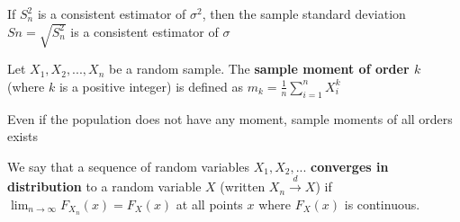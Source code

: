 \begin{thm}
    If $S_n^2$ is a consistent estimator of $\sigma^2$, then the sample standard deviation $Sn = \sqrt{S_n^2}$ is a consistent estimator of $\sigma$
\end{thm}

\begin{defn}
    Let $X_1, X_2, ..., X_n$ be a random sample. The \textbf{sample moment of order $k$} (where $k$ is a positive integer) is defined as $m_k = \frac{1}{n} \sum_{i=1}^n X_i^k$
\end{defn}

\begin{note}
    Even if the population does not have any moment, sample moments of all orders exists
\end{note}

\begin{defn}
    We say that a sequence of random variables $X_1, X_2, ...$ \textbf{converges in distribution} to a random variable $X$ (written $X_n \overset{d}{\to} X$) if $\lim_{n \to \infty} F_{X_n}(x) = F_X(x)$ at all points $x$ where $F_X(x)$ is continuous.
\end{defn}
